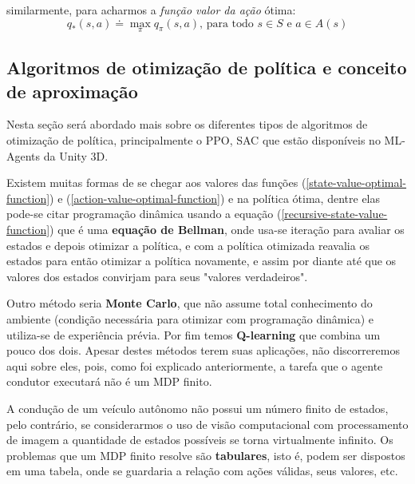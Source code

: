 similarmente, para acharmos a \textit{função valor da ação} ótima:
\begin{equation}\label{action-value-optimal-function}
   q_\ast(s,a) \doteq \max_{\pi}q_\pi(s,a) \text{, para todo } s \in S \text{ e } a \in A(s)
\end{equation}


\subsection{Algoritmos de otimização de política e conceito de aproximação}
Nesta seção será abordado mais sobre os diferentes tipos de algoritmos de otimização de política, principalmente o PPO, SAC que estão disponíveis no ML-Agents da Unity 3D. 

Existem muitas formas de se chegar aos valores das funções (\ref{state-value-optimal-function}) e (\ref{action-value-optimal-function}) e na política ótima, dentre elas pode-se citar programação dinâmica usando a equação (\ref{recursive-state-value-function}) que é uma \textbf{equação de Bellman}, onde usa-se iteração para avaliar os estados e depois otimizar a política, e com a política otimizada reavalia os estados para então otimizar a política novamente, e assim por diante até que os valores dos estados convirjam para seus "valores verdadeiros". 

Outro método seria \textbf{Monte Carlo}, que não assume total conhecimento do ambiente (condição necessária para otimizar com programação dinâmica) e utiliza-se de experiência prévia. Por fim temos \textbf{Q-learning} que combina um pouco dos dois. Apesar destes métodos terem suas aplicações, não discorreremos aqui sobre eles, pois, como foi explicado anteriormente, a tarefa que o agente condutor executará não é um MDP finito. 

A condução de um veículo autônomo não possui um número finito de estados, pelo contrário, se considerarmos o uso de visão computacional com processamento de imagem a quantidade de estados possíveis se torna virtualmente infinito. Os problemas que um MDP finito resolve são \textbf{tabulares}, isto é, podem ser dispostos em uma tabela, onde se guardaria a relação com ações válidas, seus valores, etc.

